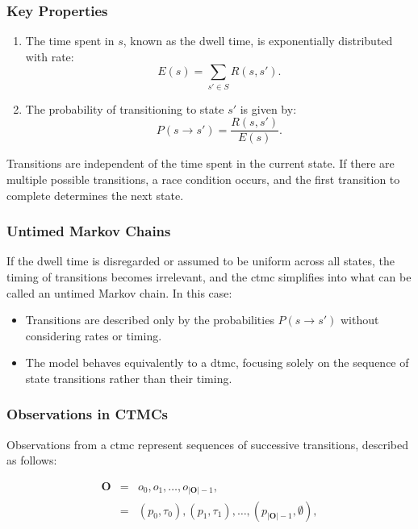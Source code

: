 \subsubsection{Key Properties}

\begin{enumerate}
    \item The time spent in $s$, known as the dwell time, is exponentially distributed with rate:
    \begin{equation}
        E(s) = \sum_{s' \in S} R(s, s').
    \end{equation}
    \item The probability of transitioning to state $s'$ is given by:
    \begin{equation}
        P(s \rightarrow s') = \frac{R(s, s')}{E(s)}.
    \end{equation}
\end{enumerate}
    
Transitions are independent of the time spent in the current state. If there are multiple possible transitions, a race condition occurs, and the first transition to complete determines the next state.

\subsubsection{Untimed Markov Chains}
If the dwell time is disregarded or assumed to be uniform across all states, the timing of transitions becomes irrelevant, and the \gls{ctmc} simplifies into what can be called an untimed Markov chain. In this case:
\begin{itemize}
    \item Transitions are described only by the probabilities $P(s \rightarrow s')$ without considering rates or timing.
    \item The model behaves equivalently to a \gls{dtmc}, focusing solely on the sequence of state transitions rather than their timing.
\end{itemize}

\subsubsection{Observations in CTMCs}
Observations from a \gls{ctmc} represent sequences of successive transitions, described as follows:

\begin{eqnarray}
        \textbf{O} &=& o_0, o_1, \dots, o_{|\textbf{O}|-1}, \\ 
                   &=& (p_0,\tau_0), (p_1,\tau_1), \dots, (p_{|\textbf{O}|-1}, \emptyset),  
    \label{eq:observation-sequence} 
\end{eqnarray}

